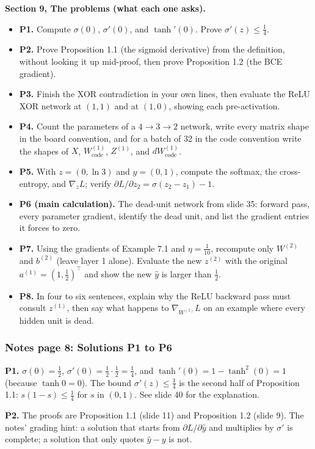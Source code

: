 \textbf{Section 9, The problems (what each one asks).}
\begin{itemize}
\item \textbf{P1.} Compute $\sigma(0)$, $\sigma'(0)$, and $\tanh'(0)$. Prove $\sigma'(z)\le\tfrac14$.
\item \textbf{P2.} Prove Proposition 1.1 (the sigmoid derivative) from the definition, without looking it up mid-proof, then prove Proposition 1.2 (the BCE gradient).
\item \textbf{P3.} Finish the XOR contradiction in your own lines, then evaluate the ReLU XOR network at $(1,1)$ and at $(1,0)$, showing each pre-activation.
\item \textbf{P4.} Count the parameters of a $4\to3\to2$ network, write every matrix shape in the board convention, and for a batch of 32 in the code convention write the shapes of $X$, $W^{(1)}_{\text{code}}$, $Z^{(1)}$, and $dW^{(1)}_{\text{code}}$.
\item \textbf{P5.} With $z=(0,\ln3)$ and $y=(0,1)$, compute the softmax, the cross-entropy, and $\nabla_zL$; verify $\partial L/\partial z_2=\sigma(z_2-z_1)-1$.
\item \textbf{P6 (main calculation).} The dead-unit network from slide 35: forward pass, every parameter gradient, identify the dead unit, and list the gradient entries it forces to zero.
\item \textbf{P7.} Using the gradients of Example 7.1 and $\eta=\tfrac1{10}$, recompute only $W^{(2)}$ and $b^{(2)}$ (leave layer 1 alone). Evaluate the new $z^{(2)}$ with the original $a^{(1)}=(1,\tfrac12)^\top$ and show the new $\hat{y}$ is larger than $\tfrac12$.
\item \textbf{P8.} In four to six sentences, explain why the ReLU backward pass must consult $z^{(1)}$, then say what happens to $\nabla_{W^{(1)}}L$ on an example where every hidden unit is dead.
\end{itemize}

\subsubsection{Notes page 8: Solutions P1 to P6}

\textbf{P1.} $\sigma(0)=\tfrac12$, $\sigma'(0)=\tfrac12\cdot\tfrac12=\tfrac14$, and $\tanh'(0)=1-\tanh^2(0)=1$ (because $\tanh0=0$). The bound $\sigma'(z)\le\tfrac14$ is the second half of Proposition 1.1: $s(1-s)\le\tfrac14$ for $s$ in $(0,1)$. See slide 40 for the explanation.

\textbf{P2.} The proofs are Proposition 1.1 (slide 11) and Proposition 1.2 (slide 9). The notes' grading hint: a solution that starts from $\partial L/\partial\hat{y}$ and multiplies by $\sigma'$ is complete; a solution that only quotes $\hat{y}-y$ is not.

